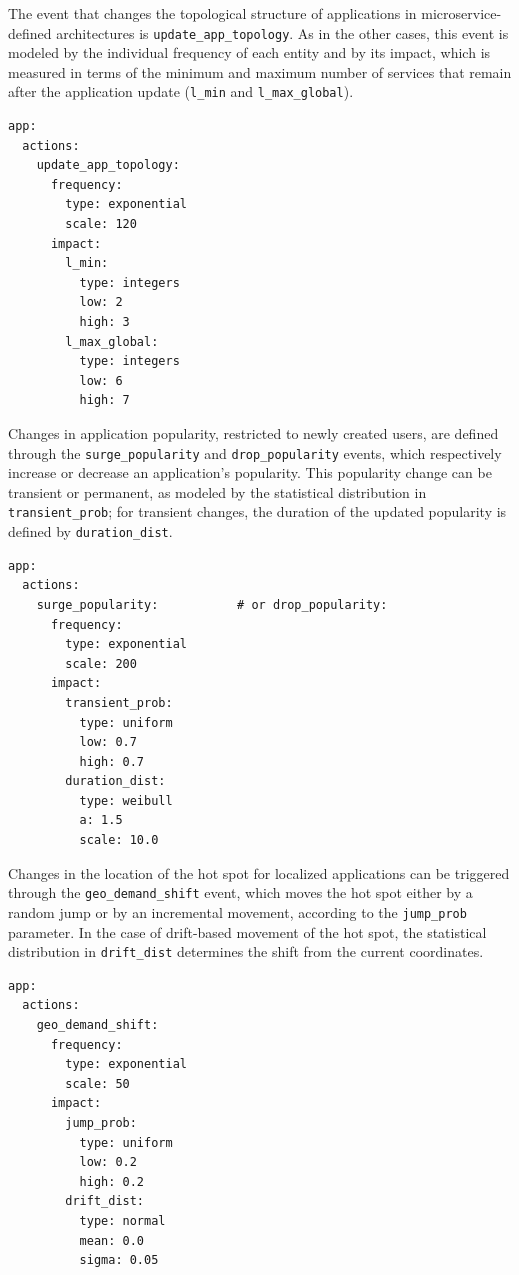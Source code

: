 \documentclass[ASNA]{USG} %
\begin{document}
The event that changes the topological structure of applications in microservice-defined architectures is \texttt{update\_app\_topology}. As in the other cases, this event is modeled by the individual frequency of each entity and by its impact, which is measured in terms of the minimum and maximum number of services that remain after the application update (\texttt{l\_min} and \texttt{l\_max\_global}).

\begin{lstlisting}[caption={YAML configuration for application lifecycle event.},label=lst:user_event, basicstyle=\fontsize{8}{10}\selectfont\ttfamily]
app:
  actions:
    update_app_topology:
      frequency:
        type: exponential
        scale: 120
      impact:
        l_min:
          type: integers
          low: 2
          high: 3
        l_max_global:
          type: integers
          low: 6
          high: 7
\end{lstlisting}


Changes in application popularity, restricted to newly created users, are defined through the \texttt{surge\_popularity} and \texttt{drop\_popularity} events, which respectively increase or decrease an application's popularity. This popularity change can be transient or permanent, as modeled by the statistical distribution in \texttt{transient\_prob}; for transient changes, the duration of the updated popularity is defined by \texttt{duration\_dist}.


\begin{lstlisting}[caption={YAML configuration for application popularity events.},label=lst:user_event, basicstyle=\fontsize{8}{10}\selectfont\ttfamily]
app:
  actions:
    surge_popularity:           # or drop_popularity:
      frequency:
        type: exponential
        scale: 200
      impact:
        transient_prob:
          type: uniform
          low: 0.7
          high: 0.7
        duration_dist:
          type: weibull
          a: 1.5
          scale: 10.0
\end{lstlisting}


Changes in the location of the hot spot for localized applications can be triggered through the \texttt{geo\_demand\_shift} event, which moves the hot spot either by a random jump or by an incremental movement, according to the \texttt{jump\_prob} parameter. In the case of drift-based movement of the hot spot, the statistical distribution in \texttt{drift\_dist} determines the shift from the current coordinates.


\begin{lstlisting}[caption={YAML configuration for hot spot changes for localized applications.},label=lst:user_event, basicstyle=\fontsize{8}{10}\selectfont\ttfamily]
app:
  actions:
    geo_demand_shift:
      frequency:
        type: exponential
        scale: 50
      impact:
        jump_prob:
          type: uniform
          low: 0.2
          high: 0.2
        drift_dist:
          type: normal
          mean: 0.0
          sigma: 0.05
\end{lstlisting}
\end{document}
